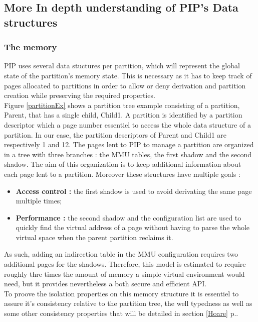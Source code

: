 \subsection{More In depth understanding of PIP's Data structures}

\subsubsection{The memory}

PIP uses several data stuctures per partition, which will represent the global state of the partition's memory state. This is necessary as it has to keep track of pages allocated to partitions in order to allow or deny derivation and partition creation while preserving the required properties. \\

Figure \ref{partitionEx} shows a partition tree example consisting of a  partition, Parent, that has a single child, Child1. A partition is identified by a partition descriptor which a page number essentiel to access the whole data structure of a partition. In our case, the partition descriptors of Parent and Child1 are respectively 1 and 12. The pages lent to PIP to manage a partition are organized in a tree with three branches : the MMU tables, the first shadow and the second shadow. The aim of this organization is to keep additional information about each page lent to a partition. Moreover these structures have multiple goals :
\begin{itemize}
	\item \textbf{Access control :} the first shadow is used to avoid derivating the same page multiple times;
	\item \textbf{Performance :} the second shadow and the configuration list are used to quickly find the virtual address of a page without having to parse the whole virtual space when the parent partition reclaims it.
\end{itemize} 
As such, adding an indirection table in the MMU configuration requires two additional pages for the shadows. Therefore, this model is estimated to require roughly thre times the amount of memory a simple virtual environment would need, but it provides nevertheless a both secure and efficient API. \\

To proove the isolation properties on this memory structure it is essentiel to assure it's consistency relative to the partition tree, the well typedness as well as some other consistency properties that will be detailed in section \ref{Hoare} p.\pageref{Hoare}.

